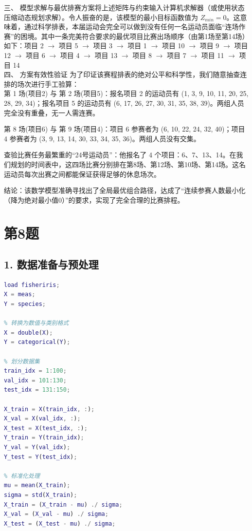 \documentclass[UTF8]{article}
\begin{document}
三、 模型求解与最优排赛方案将上述矩阵与约束输入计算机求解器（或使用状态压缩动态规划求解）。令人振奋的是，该模型的最小目标函数值为 $Z_{min} = 0$。这意味着，通过科学排表，本届运动会完全可以做到没有任何一名运动员面临“连场作赛”的困境。其中一条完美符合要求的最优项目比赛出场顺序（由第1场至第14场）如下：项目 2 $\rightarrow$ 项目 5 $\rightarrow$ 项目 3 $\rightarrow$ 项目 1 $\rightarrow$ 项目 10 $\rightarrow$ 项目 9 $\rightarrow$ 项目 12 $\rightarrow$ 项目 6 $\rightarrow$ 项目 4 $\rightarrow$ 项目 13 $\rightarrow$ 项目 8 $\rightarrow$ 项目 7 $\rightarrow$ 项目 11 $\rightarrow$ 项目 14\\
四、 方案有效性验证
为了印证该赛程排表的绝对公平和科学性，我们随意抽查连排的场次进行手工验算：\\
第 1 场(项目2) 与 第 2 场(项目5)：报名项目 2 的运动员有 (1, 3, 9, 10, 11, 20, 25, 28, 29, 34)；报名项目 5 的运动员有 (6, 17, 26, 27, 30, 31, 35, 38, 39)。两组人员完全没有重叠，无一人需连赛。

第 8 场(项目6) 与 第 9 场(项目4)：项目 6 参赛者为 (6, 10, 22, 24, 32, 40)；项目 4 参赛者为 (3, 9, 13, 14, 30, 33, 34, 35, 36)。两组人员没有交集。

查验比赛任务最繁重的“24号运动员”：他报名了 4 个项目：6、7、13、14。在我们规划的时间表中，这四场比赛分别排在第8场、第12场、第10场、第14场。这名运动员每次出赛之间都能保证获得足够的休息场次。

结论：该数学模型准确寻找出了全局最优组合路径，达成了“连续参赛人数最小化（降为绝对最小值0）”的要求，实现了完全合理的比赛排程。

\section*{第8题}

\subsection*{1. 数据准备与预处理}

\begin{lstlisting}[language=Matlab,caption=数据准备与预处理]
% 载入数据
load fisheriris;
X = meas;
Y = species;

% 转换为数值与类别格式
X = double(X);
Y = categorical(Y);

% 划分数据集
train_idx = 1:100;
val_idx = 101:130;
test_idx = 131:150;

X_train = X(train_idx, :);
X_val = X(val_idx, :);
X_test = X(test_idx, :);
Y_train = Y(train_idx);
Y_val = Y(val_idx);
Y_test = Y(test_idx);

% 标准化处理
mu = mean(X_train);
sigma = std(X_train);
X_train = (X_train - mu) ./ sigma;
X_val = (X_val - mu) ./ sigma;
X_test = (X_test - mu) ./ sigma;
\end{lstlisting}
\end{document}

